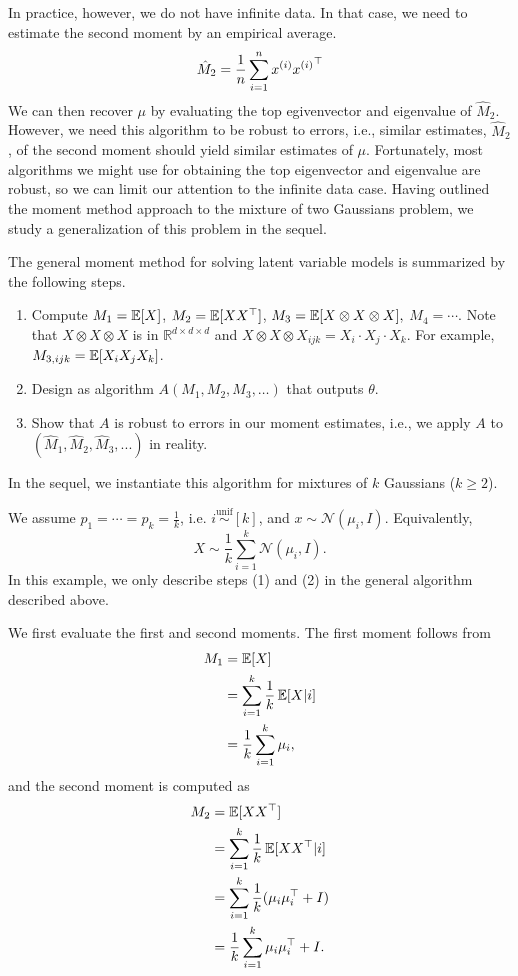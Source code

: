 In practice, however, we do not have infinite data. In that case, we need to estimate the second moment by an empirical average.
\begin{align}
    \hat{M}_2=\frac{1}{n}\sum_{i=1}^nx\sp{i} {x\sp{i}}^\top
\end{align}
We can then recover $\mu$ by evaluating the top egivenvector and eigenvalue of $\hat{M}_2$. However, we need this algorithm to be robust to errors, i.e., similar estimates, $\hat{M}_2$, of the second moment should yield similar estimates of $\mu$. Fortunately, most algorithms we might use for obtaining the top eigenvector and eigenvalue are robust, so we can limit our attention to the infinite data case. Having outlined the moment method approach to the mixture of two Gaussians problem, we study a generalization of this problem in the sequel.


The general moment method for solving latent variable models is summarized by the following steps.
\begin{enumerate}
    \item Compute $M_1=\Exp[X]$, $M_2=\Exp[XX^\top]$, $M_3=\Exp[X\otimes X\otimes X],$ $M_4 = \cdots$. Note that $X\otimes X\otimes X$ is in $\mathbb{R}^{d\times d\times d}$ and $X\otimes X\otimes X_{ijk}=X_i\cdot X_j\cdot X_k$. For example, $M_{3,ijk}=\Exp[X_iX_jX_k]$.
    \item Design as algorithm $A(M_1, M_2, M_3,\dots)$ that outputs $\theta$.
    \item Show that $A$ is robust to errors in our moment estimates, i.e., we apply $A$ to $(\hat{M}_1,\hat{M}_2,\hat{M}_3,...)$ in reality.
\end{enumerate}
In the sequel, we instantiate this algorithm for mixtures of $k$ Gaussians ($k\geq 2$). 

We assume $p_1 = \cdots = p_k =\frac{1}{k}$, i.e. $i \stackrel{\text{unif}} \sim[k]$, and $x\sim\mathcal{N}(\mu_i,I)$. Equivalently, 
\begin{equation}
    X\sim\frac{1}{k}\sum_{i=1}^k\mathcal{N}(\mu_i,I).
\end{equation}
In this example, we only describe steps (1) and (2) in the general algorithm described above. 

We first evaluate the first and second moments. The first moment follows from
\begin{align}
    M_1 &=\Exp[X] \\
    &=\sum_{i=1}^k\frac{1}{k}\Exp[X|i] \\
    &=\frac{1}{k}\sum_{i=1}^k\mu_i,
\end{align}
and the second moment is computed as
\begin{align}
    M_2 &= \Exp[XX^\top] \\
    &=\sum_{i=1}^k\frac{1}{k}\Exp[XX^\top|i] \\
    &=\sum_{i=1}^k\frac{1}{k}(\mu_i\mu_i^\top+I) \\
    &=\frac{1}{k}\sum_{i=1}^k\mu_i\mu_i^\top + I.
\end{align}


